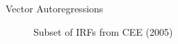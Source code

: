 

\begin{frame}{Vector Autoregressions}

\begin{figure}[!htb]
\caption{\label{fig:cee05_1} Subset of IRFs from CEE (2005)}
\end{figure}

\end{frame}



